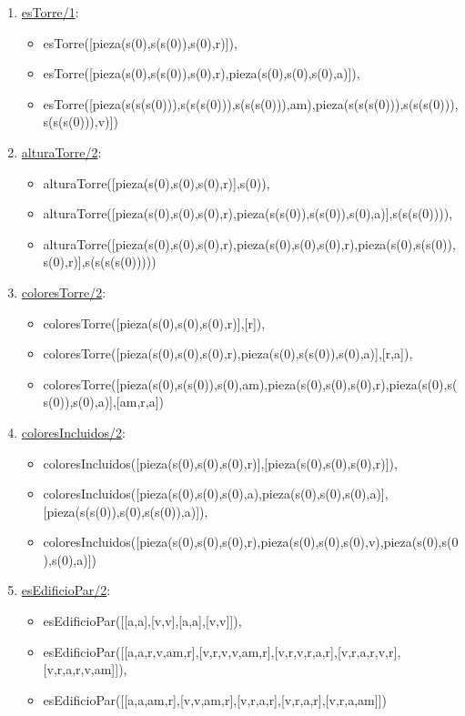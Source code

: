 \documentclass[12pt, a4paper, spanish]{article}
\begin{document}
\begin{enumerate}
\item \underline{esTorre/1}:
\begin{itemize}
	\item esTorre([pieza(s(0),s(s(0)),s(0),r)]),             
	\item esTorre([pieza(s(0),s(s(0)),s(0),r),pieza(s(0),s(0),s(0),a)]),             
	\item esTorre([pieza(s(s(s(0))),s(s(s(0))),s(s(s(0))),am),pieza(s(s(s(0))),s(s(s(0))),s(s(s(0))),v)])
\end{itemize}

\item \underline{alturaTorre/2}:
\begin{itemize}
	\item alturaTorre([pieza(s(0),s(0),s(0),r)],s(0)),             
	\item alturaTorre([pieza(s(0),s(0),s(0),r),pieza(s(s(0)),s(s(0)),s(0),a)],s(s(s(0)))),   
	\item alturaTorre([pieza(s(0),s(0),s(0),r),pieza(s(0),s(0),s(0),r),pieza(s(0),s(s(0)),s(0),r)],s(s(s(s(0)))))
\end{itemize}

\item \underline{coloresTorre/2}:
\begin{itemize}
	\item coloresTorre([pieza(s(0),s(0),s(0),r)],[r]),             
	\item coloresTorre([pieza(s(0),s(0),s(0),r),pieza(s(0),s(s(0)),s(0),a)],[r,a]),             
	\item coloresTorre([pieza(s(0),s(s(0)),s(0),am),pieza(s(0),s(0),s(0),r),pieza(s(0),s(s(0)),s(0),a)],[am,r,a])
\end{itemize}

\item \underline{coloresIncluidos/2}:
\begin{itemize}
	\item coloresIncluidos([pieza(s(0),s(0),s(0),r)],[pieza(s(0),s(0),s(0),r)]),             
	\item coloresIncluidos([pieza(s(0),s(0),s(0),a),pieza(s(0),s(0),s(0),a)],[pieza(s(s(0)),s(0),s(s(0)),a)]),             
	\item coloresIncluidos([pieza(s(0),s(0),s(0),r),pieza(s(0),s(0),s(0),v),pieza(s(0),s(0),s(0),a)])
\end{itemize}

\item \underline{esEdificioPar/2}:
\begin{itemize}
	\item esEdificioPar([[a,a],[v,v],[a,a],[v,v]]),             
	\item esEdificioPar([[a,a,r,v,am,r],[v,r,v,v,am,r],[v,r,v,r,a,r],[v,r,a,r,v,r],[v,r,a,r,v,am]]),             
	\item esEdificioPar([[a,a,am,r],[v,v,am,r],[v,r,a,r],[v,r,a,r],[v,r,a,am]])
\end{itemize}


\end{enumerate}
\end{document}
